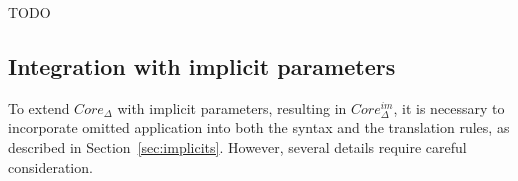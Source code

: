 \documentclass[acmsmall,review,screen]{acmart}
\begin{document}

%
%








TODO %

\subsection{Integration with implicit parameters}

To extend $Core_\Delta$ with implicit parameters, resulting in $Core_\Delta^{im}$, it is necessary to incorporate omitted application into both the syntax and the translation rules, as described in Section~\ref{sec:implicits}.
However, several details require careful consideration.
\end{document}
